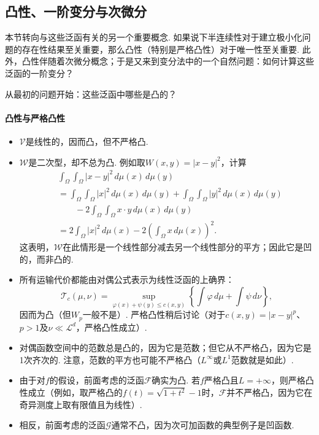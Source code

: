 \subsection{凸性、一阶变分与次微分}\label{sec:7.2}
本节转向与这些泛函有关的另一个重要概念. 如果说下半连续性对于建立极小化问题的存在性结果至关重要，那么凸性（特别是严格凸性）对于唯一性至关重要. 此外，凸性伴随着次微分概念；于是又来到变分法中的一个自然问题：如何计算这些泛函的一阶变分？

从最初的问题开始：这些泛函中哪些是凸的？
\paragraph{凸性与严格凸性}
\begin{itemize}
 \item $\mathscr V$是线性的，因而凸，但不严格凸.
 \item $\mathscr W$是二次型，却不总为凸. 例如取$W(x,y)=|x-y|^2$，计算
 \[
 \begin{aligned}
 &\int_\Omega\int_\Omega|x-y|^2\,d\mu(x)\,d\mu(y)\\
 &=\int_\Omega\int_\Omega|x|^2\,d\mu(x)\,d\mu(y)
 +\int_\Omega\int_\Omega|y|^2\,d\mu(x)\,d\mu(y)\\
 &\qquad-2\int_\Omega\int_\Omega x\cdot y\,d\mu(x)\,d\mu(y)\\
 &=2\int_\Omega|x|^2\,d\mu(x)-2\left(\int_\Omega x\,d\mu(x)\right)^2.
 \end{aligned}
 \]
 这表明，$\mathscr W$在此情形是一个线性部分减去另一个线性部分的平方；因此它是凹的，而非凸的.
 \item 所有运输代价都能由对偶公式表示为线性泛函的上确界：
 \[
 \mathscr T_c(\mu,\nu)=\sup_{\varphi(x)+\psi(y)\leq c(x,y)}
                    \left\{\int\varphi\,d\mu+\int\psi\,d\nu\right\},
 \]
 因而为凸（但$W_p$一般不是）. 严格凸性稍后讨论（对于$c(x,y)=|x-y|^p$、$p>1$及$\nu\ll\mathscr L^d$，严格凸性成立）.
 \item 对偶函数空间中的范数总是凸的，因为它是范数；但它从不严格凸，因为它是1次齐次的. 注意，范数的平方也可能不严格凸（$L^\infty$或$L^1$范数就是如此）.
 \item 由于对$f$的假设，前面考虑的泛函$\mathscr F$确实为凸. 若$f$严格凸且$L=+\infty$，则严格凸性成立（例如，取严格凸的$f(t)=\sqrt{1+t^2}-1$时，$\mathscr F$并不严格凸，因为它在奇异测度上取有限值且为线性）.
 \item 相反，前面考虑的泛函$\mathscr G$通常不凸，因为次可加函数的典型例子是凹函数.
\end{itemize}


